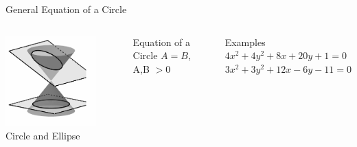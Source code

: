 \documentclass[14pt,aspectratio=169]{beamer}
\begin{document}
\begin{frame}{General Equation of a Circle}
 \begin{columns}
      \centering
        \includegraphics[width=0.8\textwidth]{image08.png}\\Circle and Ellipse
        \begin{block}{Equation of a Circle}\centering
        $A=B$, A,B $>0$  \\
        \end{block}

        \begin{exampleblock}{Examples}
         $4x^2 + 4y^2 + 8x + 20y + 1 = 0$ \\
         $3x^2 +3y^2 + 12x - 6y - 11 = 0$
        \end{exampleblock}

    \end{columns}
\end{frame}
\end{document}

